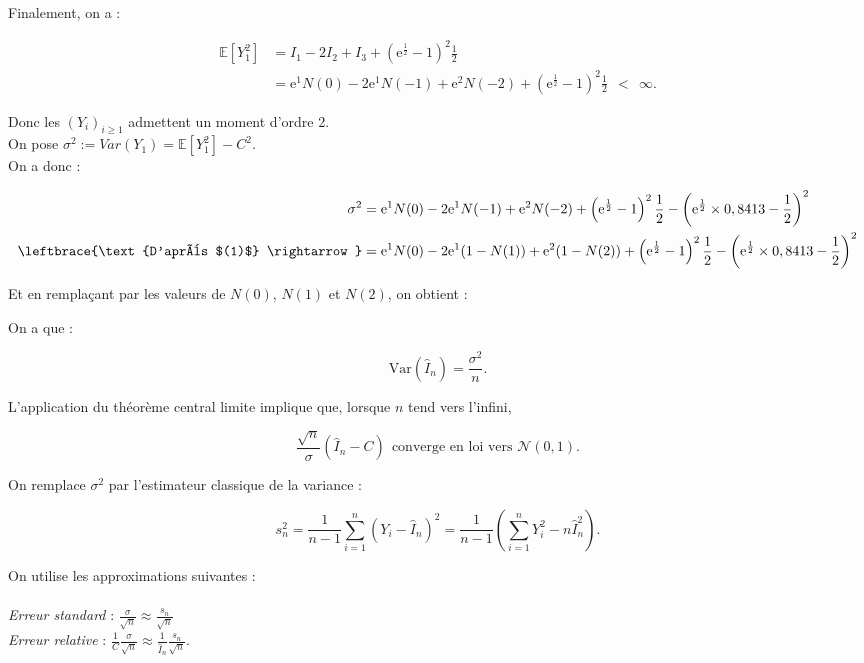 \documentclass{article}
\theoremstyle{exostyle}
\newenvironment{questions}{
\begin{enumerate}[\hspace{12pt} 1.]}{\end{enumerate}}
\begin{document}
\begin{questions}
Finalement, on a : 

\begin{align*}
    \mathbb{E}\left[ Y_{1}^{2} \right] &= I_{1} - 2I_{2} + I_{3} + \left( \text{e}^{\frac{1}{2}} - 1 \right)^{2} \frac{1}{2}\\
    &= \text{e}^{1}N(0) - 2 \text{e}^{1}N(-1) + \text{e}^{2}N(-2) + \left( \text{e}^{\frac{1}{2}} - 1 \right)^{2} \frac{1}{2} \ \ < \ \ \infty.
\end{align*}

Donc les $(Y_{i})_{i \geq 1}$ admettent un moment d'ordre 2.\\

On pose $\sigma^{2} := Var(Y_{1}) = \mathbb{E}\left[ Y_{1}^{2} \right] - C^{2}$.\\
On a donc :

\begin{align*}
\sigma^{2} &= \text{e}^{1}N(0) - 2 \text{e}^{1}N(-1) + \text{e}^{2}N(-2) + \left( \text{e}^{\frac{1}{2}} - 1 \right)^{2} \frac{1}{2} - \left( \text{e}^{\frac{1}{2}} \times 0,8413 - \frac{1}{2} \right)^{2}\\
\leftbrace{\text{D'après $(1)$} \rightarrow}&= \text{e}^{1}N(0) - 2 \text{e}^{1} (1-N(1)) + \text{e}^{2} (1-N(2)) + \left( \text{e}^{\frac{1}{2}} - 1 \right)^{2} \frac{1}{2} - \left( \text{e}^{\frac{1}{2}} \times 0,8413 - \frac{1}{2} \right)^{2}
\end{align*}

Et en remplaçant par les valeurs de $N(0)$, $N(1)$ et $N(2)$, on obtient :\\ 

\hspace{6.5cm}

\bigbreak

On a que :

\[\text{Var}(\hat{I}_{n}) = \frac{\sigma^{2}}{n}.\]

L'application du théorème central limite implique que, lorsque $n$ tend vers l'infini, 

\[\frac{\sqrt{n}}{\sigma}(\hat{I}_{n} - C) \ \ \text{converge en loi vers $\mathcal{N}(0,1)$.}\]

On remplace $\sigma^{2}$ par l'estimateur classique de la variance : 

\[s_{n}^{2} = \frac{1}{n-1} \sum_{i=1}^{n} \left( Y_{i} - \hat{I}_{n} \right)^{2} = \frac{1}{n-1} \left( \sum_{i=1}^{n} Y_{i}^{2} - n\hat{I}_{n}^{2} \right).\]

On utilise les approximations suivantes :\\
\\
\textit{Erreur standard} : $\frac{\sigma}{\sqrt{n}} \approx \frac{s_{n}}{\sqrt{n}}$\\
\textit{Erreur relative} : $\frac{1}{C}\frac{\sigma}{\sqrt{n}} \approx \frac{1}{\hat{I}_{n}}\frac{s_{n}}{\sqrt{n}}$.\\
\\


\end{questions}
\end{document}
